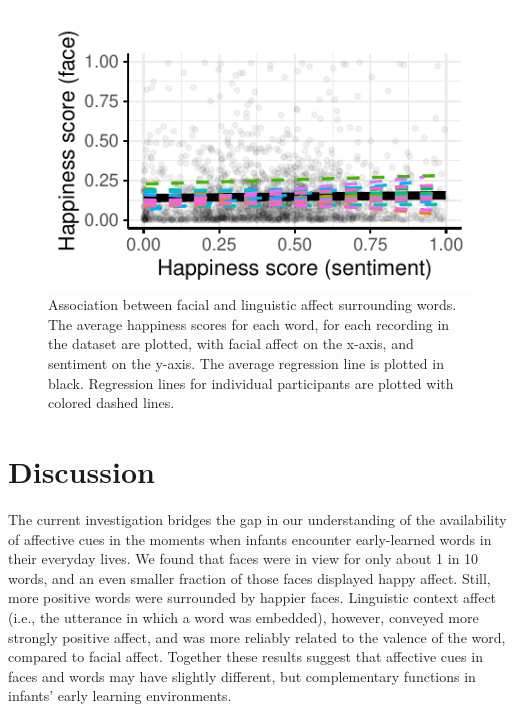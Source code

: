 \documentclass[10pt, letterpaper]{article}
\begin{document}
\begin{CodeChunk}
\begin{figure}[H]

{\centering \includegraphics{figs/figure3-1} 

}

\caption[Association between facial and linguistic affect surrounding words]{Association between facial and linguistic affect surrounding words. The average happiness scores for each word, for each recording in the dataset are plotted, with facial affect on the x-axis, and sentiment on the y-axis. The average regression line is plotted in black. Regression lines for individual participants are plotted with colored dashed lines. }\label{fig:figure3}
\end{figure}
\end{CodeChunk}

\section{Discussion}\label{discussion}

The current investigation bridges the gap in our understanding of the
availability of affective cues in the moments when infants encounter
early-learned words in their everyday lives. We found that faces were in
view for only about 1 in 10 words, and an even smaller fraction of those
faces displayed happy affect. Still, more positive words were surrounded
by happier faces. Linguistic context affect (i.e., the utterance in
which a word was embedded), however, conveyed more strongly positive
affect, and was more reliably related to the valence of the word,
compared to facial affect. Together these results suggest that affective
cues in faces and words may have slightly different, but complementary
functions in infants' early learning environments.
\end{document}
